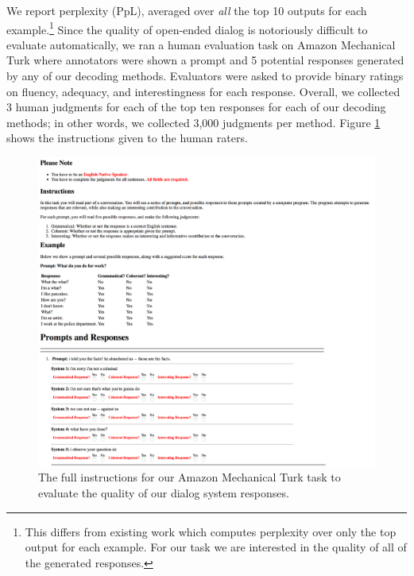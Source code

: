 We report perplexity (PpL), averaged over \textit{all} the top 10 outputs for each example.\footnote{This differs from existing work which computes perplexity over only the top output for each example. For our task we are interested in the quality of all of the generated responses.} Since the quality of open-ended dialog is notoriously difficult to evaluate automatically, we ran a human evaluation task on Amazon Mechanical Turk where annotators were shown a prompt and 5 potential responses generated by any of our decoding methods.
Evaluators were asked to provide binary ratings on fluency, adequacy, and interestingness for each response. Overall, we collected 3 human judgments for each of the top ten responses for each of our decoding methods; in other words, we collected 3,000 judgments per method.
Figure \ref{figure:mturk_example} shows the instructions given to the human raters.

\begin{figure}
    \includegraphics[width=15cm]{figures/dediv_mturk_example}
    \caption{The full instructions for our Amazon Mechanical Turk task to evaluate the quality of our dialog system responses.}
    \label{figure:mturk_example}
\end{figure}

